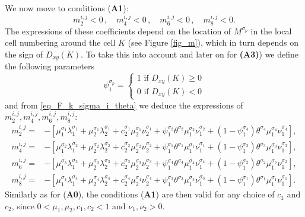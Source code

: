\documentclass[final,11pt]{elsarticle}
\begin{document}
We now move to conditions (\textbf{A1}):
\[
    m_2^{i,j}<0\,,\quad m_4^{i,j}<0\,,\quad m_6^{i,j}<0\,,\quad m_8^{i,j}<0.
\]
The expressions of these coefficients depend on the location of $M^{\sigma_p}$ in the local cell numbering around the cell $K$ (see Figure \ref{fig_m}), which in turn depends on the sign of $D_{xy}(K)$. To take this into account and later on for \textbf{(A3)}) we define the following parameters
\begin{equation}\label{eq:def.psi}
\psi_{1}^{\sigma_p}=
\begin{cases}
1 \text{ if }D_{xy}(K)\geq 0\\
0 \text{ if }D_{xy}(K)< 0
\end{cases}
\end{equation}
and from \eqref{eq_F_k_sigma_i_theta} we deduce the expressions of $m_2^{i,j},m_4^{i,j},m_6^{i,j},m_8^{i,j}$:
\begin{equation}\label{eq:formulas.meven}
    \begin{aligned}
    m_2^{i,j}={}&-\left[\mu_1^{\sigma_1}\lambda_1^{\sigma_1}+\mu_2^{\sigma_1}\lambda_2^{\sigma_1}+c_2^{\sigma_1}\mu_2^{\sigma_1}\nu_2^{\sigma_1}+\psi_1^{\sigma_2}\theta^{\sigma_2}\mu_1^{\sigma_2}\nu_1^{\sigma_2}+(1-\psi_1^{\sigma_4})\theta^{\sigma_4}\mu_1^{\sigma_4}\nu_1^{\sigma_4}\right],\\
    m_4^{i,j}={}&
    -\left[\mu_1^{\sigma_2}\lambda_1^{\sigma_2}+\mu_2^{\sigma_2}\lambda_2^{\sigma_2}+c_2^{\sigma_2}\mu_2^{\sigma_2}\nu_2^{\sigma_2}+\psi_1^{\sigma_1}\theta^{\sigma_1}\mu_1^{\sigma_1}\nu_1^{\sigma_1}+(1-\psi_1^{\sigma_3})\theta^{\sigma_3}\mu_1^{\sigma_3}\nu_1^{\sigma_3}\right],\\
    m_6^{i,j}={}&-\left[\mu_1^{\sigma_3}\lambda_1^{\sigma_3}+\mu_2^{\sigma_3}\lambda_2^{\sigma_3}+c_2^{\sigma_3}\mu_2^{\sigma_3}\nu_2^{\sigma_3}+\psi_1^{\sigma_4}\theta^{\sigma_4}\mu_1^{\sigma_4}\nu_1^{\sigma_4}+(1-\psi_1^{\sigma_2})\theta^{\sigma_2}\mu_1^{\sigma_2}\nu_1^{\sigma_2}\right],\\
    m_8^{i,j}={}&-\left[\mu_1^{\sigma_4}\lambda_1^{\sigma_4}+\mu_2^{\sigma_4}\lambda_2^{\sigma_4}+c_2^{\sigma_4}\mu_2^{\sigma_4}\nu_2^{\sigma_4}+\psi_1^{\sigma_3}\theta^{\sigma_3}\mu_1^{\sigma_3}\nu_1^{\sigma_3}+(1-\psi_1^{\sigma_1})\theta^{\sigma_1}\mu_1^{\sigma_1}\nu_1^{\sigma_1}\right].
    \end{aligned}
\end{equation}
Similarly as for (\textbf{A0}), the conditions (\textbf{A1}) are then valid for any choice of $c_1$ and $c_2$, since $0<\mu_1,\mu_2,c_1,c_2<1$ and $\nu_1,\nu_2>0$.
\end{document}
